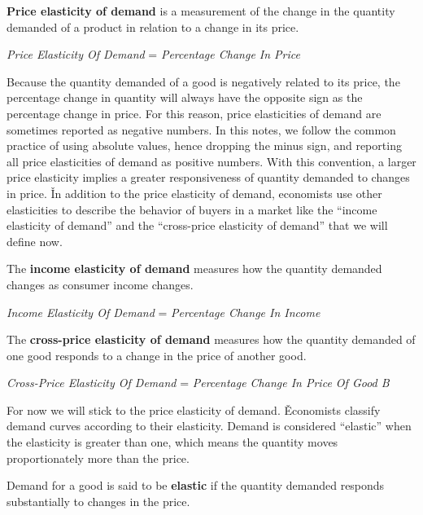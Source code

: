 \textbf{Price elasticity of demand} is a measurement of the change in the quantity demanded of a product in relation
to a change in its price.

\bse
\textit{Price Elasticity Of Demand} = 
{\textit{Percentage Change In Price}}
\ese
\ed

Because the quantity demanded of a good is negatively related to its price, the percentage change in quantity will
always have the opposite sign as the percentage change in price. For this reason, price elasticities of demand are
sometimes reported as negative numbers. In this notes, we follow the common practice of using absolute values, hence
dropping the minus sign, and reporting all price elasticities of demand as positive numbers. With this convention, a
larger price elasticity implies a greater responsiveness of quantity demanded to changes in price. \v

In addition to the price elasticity of demand, economists use other elasticities to describe the behavior of buyers
in a market like the ``income elasticity of demand'' and the ``cross-price elasticity of demand'' that we will define
now.

The \textbf{income elasticity of demand} measures how the quantity demanded changes as consumer income changes.

\bse
\textit{Income Elasticity Of Demand} = 
{\textit{Percentage Change In Income}}
\ese
\ed

The \textbf{cross-price elasticity of demand} measures how the quantity demanded of one good responds to a change in
the price of another good.

\bse
\textit{Cross-Price Elasticity Of Demand} = 
{\textit{Percentage Change In Price Of Good B}}
\ese
\ed

For now we will stick to the price elasticity of demand. \v

Economists classify demand curves according to their elasticity. Demand is considered ``elastic'' when the elasticity
is greater than one, which means the quantity moves proportionately more than the price.

Demand for a good is said to be \textbf{elastic} if the quantity demanded responds substantially to changes in the
price.

